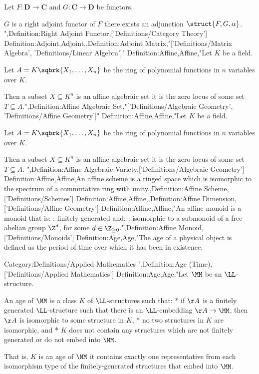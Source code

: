 Let $F : \mathbf D \to \mathbf C$ and $G : \mathbf C \to \mathbf D$ be functors.

$G$ is a right adjoint functor of $F$  there exists an adjunction $\struct {F, G, \alpha}$.
",Definition:Right Adjoint Functor,['Definitions/Category Theory']
Definition:Adjoint,Adjoint,,Definition:Adjoint Matrix,"['Definitions/Matrix Algebra', 'Definitions/Linear Algebra']"
Definition:Affine,Affine,"Let $K$ be a field.

Let $A = K \sqbrk {X_1, \ldots, X_n}$ be the ring of polynomial functions in $n$ variables over $K$.


Then a subset $X \subseteq K^n$ is an affine algebraic set  it is the zero locus of some set $T \subseteq A$.",Definition:Affine Algebraic Set,"['Definitions/Algebraic Geometry', 'Definitions/Affine Geometry']"
Definition:Affine,Affine,"Let $K$ be a field.

Let $A = K \sqbrk {X_1, \ldots, X_n}$ be the ring of polynomial functions in $n$ variables over $K$.


Then a subset $X \subseteq K^n$ is an affine algebraic set  it is the zero locus of some set $T \subseteq A$.
",Definition:Affine Algebraic Variety,['Definitions/Algebraic Geometry']
Definition:Affine,Affine,An affine scheme is a ringed space which is isomorphic to the spectrum of a commutative ring with unity.,Definition:Affine Scheme,['Definitions/Schemes']
Definition:Affine,Affine,,Definition:Affine Dimension,['Definitions/Affine Geometry']
Definition:Affine,Affine,"An affine monoid is a monoid that is:
: finitely generated
and:
: isomorphic to a submonoid of a free abelian group $\Z^d$, for some $d \in \Z_{\ge 0}$.",Definition:Affine Monoid,['Definitions/Monoids']
Definition:Age,Age,"The age of a physical object is defined as the period of time over which it has been in existence.


Category:Definitions/Applied Mathematics
",Definition:Age (Time),['Definitions/Applied Mathematics']
Definition:Age,Age,"Let $\MM$ be an $\LL$-structure.


An age of $\MM$ is a class $K$ of $\LL$-structures such that:
* if $\AA$ is a finitely generated $\LL$-structure such that there is an $\LL$-embedding $\AA \to \MM$, then $\AA$ is isomorphic to some structure in $K$,
* no two structures in $K$ are isomorphic, and
* $K$ does not contain any structures which are not finitely generated or do not embed into $\MM$.

That is, $K$ is an age of $\MM$  it contains exactly one representative from each isomorphism type of the finitely-generated structures that embed into $\MM$.



